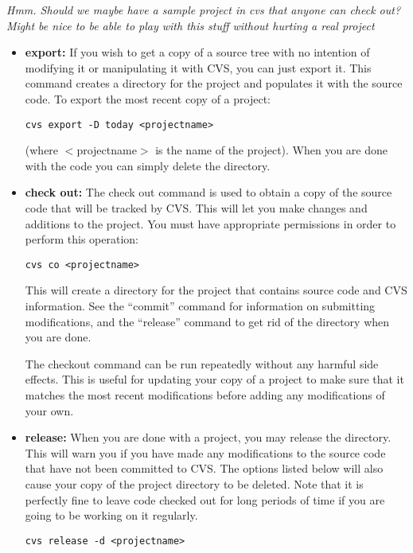 \documentclass[11pt, letterpaper]{article}
\begin{document}
\emph{Hmm. Should we maybe have a sample project in cvs that anyone can
check out?  Might be nice to be able to play with this stuff without
hurting a real project }

\begin{itemize}
	\item \textbf{export:} If you wish to get a copy of a source
	tree with no intention of modifying it or manipulating it with CVS,
	you can just export it.  This command creates a directory for the
	project and populates it with the source code.  To export the most
	recent copy of a project:
\begin{verbatim}
cvs export -D today <projectname>
\end{verbatim}
	(where $<$projectname$>$ is the name of the project).  When you are done with the
	code you can simply delete the directory.

	\item \textbf{check out:} The check out command is used to obtain a
	copy of the source code that will be tracked by CVS.  This will let
	you make changes and additions to the project.  You must have
	appropriate permissions in order to perform this operation:
\begin{verbatim}
cvs co <projectname>
\end{verbatim}
	This will create a directory for the project that contains
	source code and CVS information.  See the ``commit'' command for
	information on submitting modifications, and the ``release'' command to
	get rid of the directory when you are done.

	The checkout command can be run repeatedly without any harmful side
	effects.  This is useful for updating your copy of a project to make
	sure that it matches the most recent modifications before adding any
	modifications of your own.
	
	\item \textbf{release:} When you are done with a project, you may
	release the directory.  This will warn you if you have made any
	modifications to the source code that have not been committed to CVS.  The options listed below will also
	cause your copy of the project directory to be deleted.  Note that
	it is perfectly fine to leave code checked out for long periods of
	time if you are going to be working on it regularly.

\begin{verbatim}
cvs release -d <projectname>
\end{verbatim}


\end{itemize}
\end{document}
